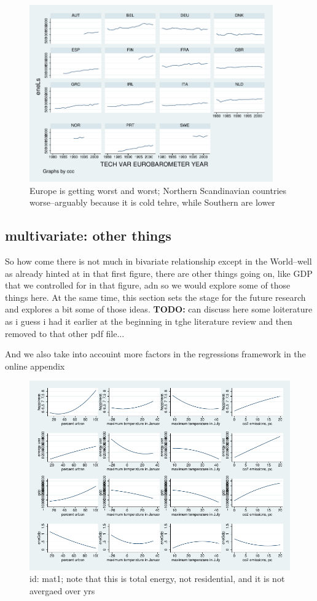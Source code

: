 \documentclass[10pt, letterpaper]{article}
\begin{document}
\begin{spacing}{1.4}
\begin{figure}[H]
 \includegraphics[height=3in]{graphsAndTables/ebTSeneLs.pdf}\centering
\caption{Europe is getting worst and worst; Northern Scandinavian countries
  worse--arguably because it is cold tehre, while Southern are lower}\label{ebTSeneLs}
\end{figure}

\subsection{multivariate: other things}
\label{mvarOthThings}

So how come there is not much in bivariate relationship except in the
World--well as already hinted at in that first figure, there are other things
going on, like GDP that we controlled for in that figure, adn so we would
explore some of those things here. At the same time, this section sets the stage
for the future research and explores a bit some of those ideas.
\textbf{TODO:} can discuss here some loiterature as i guess i had it earlier at
the beginning in tghe literature review and then removed to that other pdf file...


And we also take into accouint more factors in the regressions framework in the
online appendix

\begin{figure}[H]
 \includegraphics[width=6in]{graphsAndTables/mat1.pdf}\centering
\caption{id: mat1;  note that this is total energy, not residential, and it is not avergaed
over yrs}\label{mat1}
 \end{figure}



\end{spacing}
\end{document}

